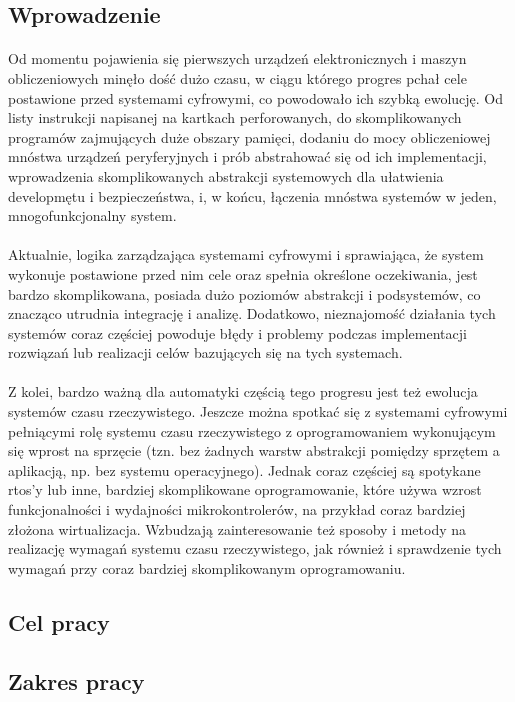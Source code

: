 \documentclass[../main]{subfiles}
\begin{document}
\subsection{Wprowadzenie}

\paragraph{}
Od momentu pojawienia się  pierwszych urządzeń elektronicznych i maszyn
obliczeniowych minęło dość dużo czasu, w ciągu którego progres pchał  cele
postawione przed systemami cyfrowymi, co powodowało ich szybką ewolucję. Od listy instrukcji napisanej
na kartkach perforowanych, do skomplikowanych programów zajmujących duże obszary pamięci, dodaniu do
mocy obliczeniowej mnóstwa urządzeń peryferyjnych i prób abstrahować się od ich implementacji,
wprowadzenia skomplikowanych abstrakcji systemowych dla ułatwienia developmętu  i
bezpieczeństwa, i, w końcu, łączenia mnóstwa systemów w jeden, mnogofunkcjonalny system.

\paragraph{}
Aktualnie, logika zarządzająca systemami cyfrowymi i sprawiająca, że system wykonuje postawione przed
nim cele oraz spełnia określone oczekiwania, jest bardzo skomplikowana, posiada dużo poziomów
abstrakcji i podsystemów, co znacząco utrudnia integrację i analizę. Dodatkowo, nieznajomość działania
 tych systemów coraz częściej powoduje błędy i problemy podczas
implementacji rozwiązań lub realizacji celów bazujących się na tych systemach.

\paragraph{}
Z kolei, bardzo ważną dla automatyki częścią tego progresu jest też ewolucja systemów czasu
rzeczywistego. Jeszcze można spotkać się z systemami cyfrowymi pełniącymi rolę systemu czasu
rzeczywistego z oprogramowaniem wykonującym się wprost na sprzęcie (tzn. bez żadnych warstw abstrakcji
pomiędzy sprzętem a aplikacją, np. bez systemu operacyjnego). Jednak coraz częściej są spotykane
\acrshort{rtos}'y lub inne, bardziej skomplikowane oprogramowanie, które używa wzrost funkcjonalności i
wydajności  mikrokontrolerów, na przykład coraz bardziej złożona wirtualizacja.
Wzbudzają zainteresowanie też sposoby i metody na realizację wymagań systemu czasu rzeczywistego, jak
również i sprawdzenie tych wymagań przy coraz bardziej skomplikowanym oprogramowaniu.

\subsection{Cel pracy}

\subsection{Zakres pracy}
\end{document}
